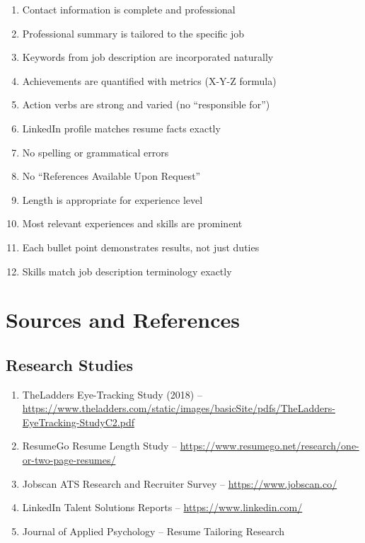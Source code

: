 \documentclass[11pt,a4paper]{article}
\begin{document}
\begin{enumerate}
    \item[$\square$] Contact information is complete and professional
    \item[$\square$] Professional summary is tailored to the specific job
    \item[$\square$] Keywords from job description are incorporated naturally
    \item[$\square$] Achievements are quantified with metrics (X-Y-Z formula)
    \item[$\square$] Action verbs are strong and varied (no ``responsible for'')
    \item[$\square$] LinkedIn profile matches resume facts exactly
    \item[$\square$] No spelling or grammatical errors
    \item[$\square$] No ``References Available Upon Request''
    \item[$\square$] Length is appropriate for experience level
    \item[$\square$] Most relevant experiences and skills are prominent
    \item[$\square$] Each bullet point demonstrates results, not just duties
    \item[$\square$] Skills match job description terminology exactly
\end{enumerate}

\section{Sources and References}

\subsection{Research Studies}

\begin{enumerate}
    \item TheLadders Eye-Tracking Study (2018) -- \url{https://www.theladders.com/static/images/basicSite/pdfs/TheLadders-EyeTracking-StudyC2.pdf}
    \item ResumeGo Resume Length Study -- \url{https://www.resumego.net/research/one-or-two-page-resumes/}
    \item Jobscan ATS Research and Recruiter Survey -- \url{https://www.jobscan.co/}
    \item LinkedIn Talent Solutions Reports -- \url{https://www.linkedin.com/}
    \item Journal of Applied Psychology -- Resume Tailoring Research
\end{enumerate}
\end{document}
